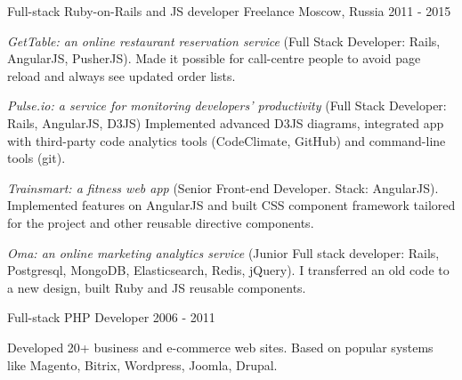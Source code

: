 


\begin{cventries}

  \cventry
    {Full-stack Ruby-on-Rails and JS developer} %
    {Freelance} %
    {Moscow, Russia} %
    {2011 - 2015} %
    {
      \begin{cvitems} %
        \item {\textit{GetTable: an online restaurant reservation service} (Full Stack Developer: Rails, AngularJS, PusherJS). Made it possible for call-centre people to avoid page reload and always see updated order lists.}
        \item {\textit{Pulse.io: a service for monitoring developers’ productivity} (Full Stack Developer: Rails, AngularJS, D3JS) Implemented advanced D3JS diagrams, integrated app with third-party code analytics tools (CodeClimate, GitHub) and command-line tools (git).}
        \item {\textit{Trainsmart: a fitness web app} (Senior Front-end Developer. Stack: AngularJS). Implemented features on AngularJS and built CSS component framework tailored for the project and other reusable directive components.}
        \item {\textit{Oma: an online marketing analytics service} (Junior Full stack developer: Rails, Postgresql, MongoDB, Elasticsearch, Redis, jQuery). I transferred an old code to a new design, built Ruby and JS reusable components.}
      \end{cvitems}
    }

  \cventry
    {Full-stack PHP Developer} %
    {} %
    {} %
    {2006 - 2011} %
    {
      \begin{cvitems} %
        \item {Developed 20+ business and e-commerce web sites. Based on popular systems like Magento, Bitrix, Wordpress, Joomla, Drupal.}
      \end{cvitems}
    }

\end{cventries}
